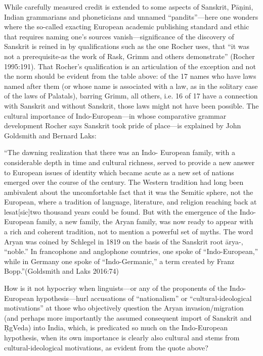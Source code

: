While carefully measured credit is extended to some aspects of Sanskrit, Pāṇini, Indian grammarians and phoneticians and unnamed “pandits”—here one wonders where the so-called exacting European academic publishing standard and ethic that requires naming one’s sources vanish—significance of the discovery of Sanskrit is reined in by qualifications such as the one Rocher uses, that “it was not a prerequisite-as the work of Rask, Grimm and others demonstrate” (Rocher 1995:191). That Rocher’s qualification is an articulation of the exception and not the norm should be evident from the table above: of the 17 names who have laws named after them (or whose name is associated with a law, as in the solitary case of the laws of Palatals), barring Grimm, all others, i.e. 16 of 17 have a connection with Sanskrit and without Sanskrit, those laws might not have been possible. The cultural importance of Indo-European—in whose comparative grammar development Rocher says Sanskrit took pride of place—is explained by John Goldsmith and Bernard Laks:

\begin{myquote}
“The dawning realization that there was an Indo- European family, with a considerable depth in time and cultural richness, served to provide a new answer to European issues of identity which became acute as a new set of nations emerged over the course of the century. The Western tradition had long been ambivalent about the uncomfortable fact that it was the Semitic sphere, not the European, where a tradition of language, literature, and religion reaching back at lesat[sic]two thousand years could be found. But with the emergence of the Indo-European family, a new family, the Aryan family, was now ready to appear with a rich and coherent tradition, not to mention a powerful set of myths. The word Aryan was coined by Schlegel in 1819 on the basis of the Sanskrit root ārya-, “noble.” In francophone and anglophone countries, one spoke of “Indo-European,” while in Germany one spoke of “Indo-Germanic,” a term created by Franz Bopp.”\hfill (Goldsmith and Laks 2016:74)
\end{myquote}

How is it not hypocrisy when linguists—or any of the proponents of the Indo-European hypothesis—hurl accusations of “nationalism” or “cultural-ideological motivations” at those who objectively question the Aryan invasion/migration (and perhaps more importantly the assumed consequent import of Sanskrit and ṚgVeda) into India, which, is predicated so much on the Indo-European hypothesis, when its own importance is clearly also cultural and stems from cultural-ideological motivations, as evident from the quote above?

